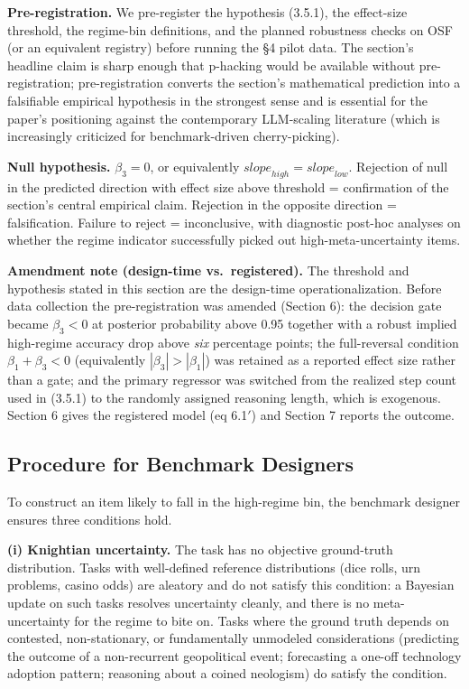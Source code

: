 \documentclass{article}
\begin{document}
\textbf{Pre-registration.} We pre-register the hypothesis (3.5.1), the
effect-size threshold, the regime-bin definitions, and the planned
robustness checks on OSF (or an equivalent registry) before running the
\S{}4 pilot data. The section's headline claim is sharp enough that
p-hacking would be available without pre-registration; pre-registration
converts the section's mathematical prediction into a falsifiable
empirical hypothesis in the strongest sense and is essential for the
paper's positioning against the contemporary LLM-scaling literature
(which is increasingly criticized for benchmark-driven cherry-picking).

\textbf{Null hypothesis.} \(\beta_{3} = 0\), or equivalently
\({slope}_{high} = {slope}_{low}\). Rejection of null in the predicted
direction with effect size above threshold = confirmation of the
section's central empirical claim. Rejection in the opposite direction =
falsification. Failure to reject = inconclusive, with diagnostic
post-hoc analyses on whether the regime indicator successfully picked
out high-meta-uncertainty items.

\textbf{Amendment note (design-time vs.~registered).} The threshold and
hypothesis stated in this section are the design-time
operationalization. Before data collection the pre-registration was
amended (Section 6): the decision gate became \(\beta_{3} < 0\) at
posterior probability above 0.95 together with a robust implied
high-regime accuracy drop above \emph{six} percentage points; the
full-reversal condition \(\beta_{1} + \beta_{3} < 0\) (equivalently
\(|\beta_{3}| > |\beta_{1}|\)) was retained as a reported effect size
rather than a gate; and the primary regressor was switched from the
realized step count used in (3.5.1) to the randomly assigned reasoning
length, which is exogenous. Section 6 gives the registered model (eq
6.1\ensuremath{\prime}) and Section 7 reports the outcome.

\subsection{Procedure for Benchmark
Designers}\label{procedure-for-benchmark-designers}

To construct an item likely to fall in the high-regime bin, the
benchmark designer ensures three conditions hold.

\textbf{(i) Knightian uncertainty.} The task has no objective
ground-truth distribution. Tasks with well-defined reference
distributions (dice rolls, urn problems, casino odds) are aleatory and
do not satisfy this condition: a Bayesian update on such tasks resolves
uncertainty cleanly, and there is no meta-uncertainty for the regime to
bite on. Tasks where the ground truth depends on contested,
non-stationary, or fundamentally unmodeled considerations (predicting
the outcome of a non-recurrent geopolitical event; forecasting a one-off
technology adoption pattern; reasoning about a coined neologism) do
satisfy the condition.
\end{document}
